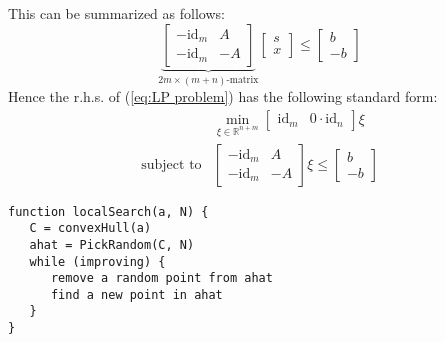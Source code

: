 \documentclass[10pt,a4paper]{article}
\newcommand{\R}{\mathbb{R}}
\newcommand{\id}{\text{id}}
\begin{document}
	This can be summarized as follows:
	\begin{equation}
	\underbrace{
		\begin{bmatrix}
		-\id_{m} & A\\
		-\id_{m} & -A
		\end{bmatrix}
	}_{\text{$2m\times (m+n)$-matrix}}
	\begin{bmatrix}
	s\\ x
	\end{bmatrix} \leq 
	\begin{bmatrix}
	b\\
	-b
	\end{bmatrix}
	\end{equation}
	Hence the r.h.s. of (\ref{eq:LP problem}) has the following standard form:
	\begin{align*}
	&\min_{\xi \in \R^{n+m}} \begin{bmatrix}
	\id_{m} & 0 \cdot \id_{n}
	\end{bmatrix} \xi\\
	\text{subject to}& \begin{bmatrix}
	-\id_{m} & A\\
	-\id_{m} & -A
	\end{bmatrix} 
	\xi \leq 
	\begin{bmatrix}
	b\\
	-b
	\end{bmatrix}
	\end{align*}
	\begin{lstlisting}[caption={A algorithm to find a local solution},basicstyle=\small]
function localSearch(a, N) {
   C = convexHull(a)
   ahat = PickRandom(C, N)
   while (improving) {
      remove a random point from ahat
      find a new point in ahat
   }
}
	\end{lstlisting}
	
\end{document}
